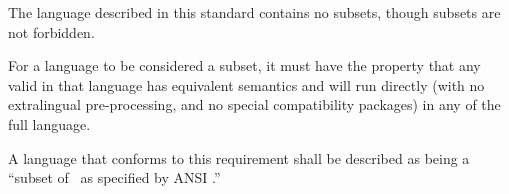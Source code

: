 
The language described in this standard contains no subsets,
though subsets are not forbidden.

For a language to be considered a subset,
it must have the property that any valid  in that language
has equivalent semantics and will run directly
(with no extralingual pre-processing, and no special compatibility packages)
in any  of the full language.

A language that conforms to this requirement shall be described
as being a ``subset of \clisp\ as specified by ANSI .''
